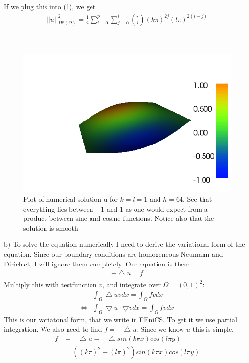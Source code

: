 \documentclass[11pt,a4paper]{report}
\begin{document}
If we plug this into (1), we get
\begin{gather*}
||u||_{H^p(\Omega)}^2 = \frac{1}{4}\sum_{i=0}^p \sum_{j=0}^{i}\binom {i} {j}(k\pi)^{2j}(l\pi)^{2(i-j)}  
\end{gather*}
\\
\\
\begin{figure}
  \includegraphics[width=\linewidth]{dolfin_plot_0.png}
  \caption{Plot of numerical solution u for $k=l=1$ and $h=64$. See that everything lies between $-1$ and $1$ as one would expect from a product between sine and cosine functions. Notice also that the solution is smooth}
  \label{Fig 1}
\end{figure}
b) To solve the equation numerically I need to derive the variational form of the equation. Since our boundary conditions are homogeneous Neumann and Dirichlet, I will ignore them completely. Our equation is then:
\begin{align*}
-\bigtriangleup u = f \\
\end{align*} 
Multiply this with testfunction $v$, and integrate over $\Omega=(0,1)^2$:
\begin{align*}
-&\int_{\Omega}\bigtriangleup uvdx=\int_{\Omega}fvdx \\
\iff &\int_{\Omega}\bigtriangledown u\cdot\bigtriangledown vdx = \int_{\Omega}fvdx
\end{align*}
This is our variatonal form, that we write in FEniCS. To get it we use partial integration. We also need to find $f=-\bigtriangleup u$. Since we know $u$ this is simple.
\begin{align*}
f&=-\bigtriangleup u=-\bigtriangleup sin(k\pi x)cos(l\pi y) \\
&= ((k\pi)^2 +(l\pi)^2)sin(k\pi x)cos(l\pi y)
\end{align*} 
\end{document}

